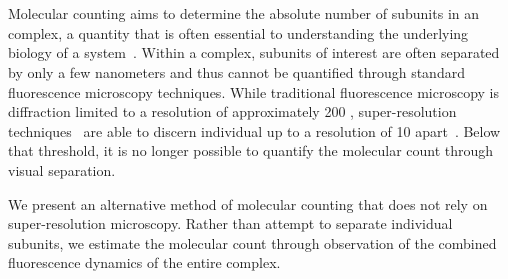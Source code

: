 \section{}



%
Molecular counting aims to determine the absolute number of subunits 
in an complex, a quantity that is often essential to understanding
the underlying biology of a system~\citep{irvine_2002, inman_2002,
moustakas_2002, felce_2018, breitwieser_2004, milstein_single-molecule_2022}.
%
%
Within a complex, subunits of interest are often separated by only a few
nanometers and thus cannot be quantified through standard fluorescence
microscopy techniques.
  While traditional fluorescence microscopy is diffraction limited to a resolution 
  of approximately 200 \nanometer, super-resolution 
  techniques~\citep{betzig_2006,rust_2006,rittweger_sted_2009} 
  are able to discern individual \smallobjects up to a resolution of 10 \nanometer 
  apart~\citep{valli_seeing_2021}.
  Below that threshold, it is no longer possible to quantify the molecular count 
  through visual separation.

%
We present an alternative method of molecular counting 
that does not rely on super-resolution microscopy.
%
  Rather than attempt to separate individual subunits, we estimate the 
  molecular count through observation of the combined fluorescence dynamics 
  of the entire complex.


